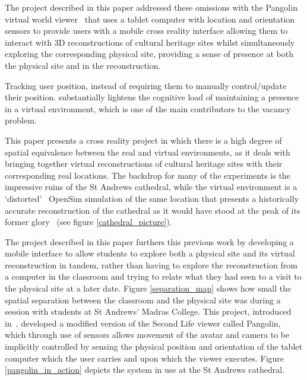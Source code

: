 The project described in this paper addressed these omissions with the Pangolin virtual world viewer~\cite{Daviesa} that uses a tablet computer with location and orientation sensors to provide users with a mobile cross reality interface allowing them to interact with 3D reconstructions of cultural heritage sites whilst simultaneously exploring the corresponding physical site, providing a sense of presence at both the physical site and in the reconstruction.


Tracking user position, instead of requiring them to manually control/update their position. substantially lightens the cognitive load of maintaining a presence in a virtual environment, which is one of the main contributors to the vacancy problem.

This paper presents a cross reality project in which there is a high degree of spatial equivalence between the real and virtual environments, as it deals with bringing together virtual reconstructions of cultural heritage sites with their corresponding real locations. The backdrop for many of the experiments is the impressive ruins of the St Andrews cathedral, while the virtual environment is a `distorted'~\cite{lifton:merging} OpenSim simulation of the same location that presents a historically accurate reconstruction of the cathedral as it would have stood at the peak of its former glory~\cite{Kennedy2012, OpenVirtualWorldsgroupSchoolofComputerScience} (see figure \ref{cathedral_picture}).




The project described in this paper furthers this previous work by developing a mobile interface to allow students to explore both a physical site and its virtual reconstruction in tandem, rather than having to explore the reconstruction from a computer in the classroom and trying to relate what they had seen to a visit to the physical site at a later date. Figure \ref{separation_map} shows how small the spatial separation between the classroom and the physical site was during a session with students at St Andrews' Madras College. This project, introduced in~\cite{Davies2012}, developed a modified version of the Second Life viewer called Pangolin, which through use of sensors allows movement of the avatar and camera to be implicitly controlled by sensing the physical position and orientation of the tablet computer which the user carries and upon which the viewer executes. Figure \ref{pangolin_in_action} depicts the system in use at the St Andrews cathedral.

